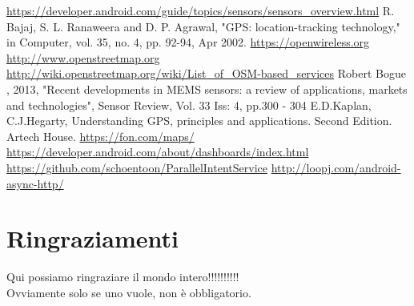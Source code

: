 \documentclass[12pt,a4paper,openright,twoside]{report}
\begin{document}
\begin{thebibliography}{90}
 \url{https://developer.android.com/guide/topics/sensors/sensors_overview.html}
 R. Bajaj, S. L. Ranaweera and D. P. Agrawal, "GPS: location-tracking technology," in Computer, vol. 35, no. 4, pp. 92-94, Apr 2002.
 \url{https://openwireless.org}
 \url{http://www.openstreetmap.org}
 \url{http://wiki.openstreetmap.org/wiki/List_of_OSM-based_services}
 Robert Bogue , 2013, "Recent developments in MEMS sensors: a review of applications, markets and technologies", Sensor Review, Vol. 33 Iss: 4, pp.300 - 304
 E.D.Kaplan, C.J.Hegarty, Understanding GPS, principles and applications. Second Edition. Artech House.
 \url{https://fon.com/maps/}
 \url{https://developer.android.com/about/dashboards/index.html}
 \url{https://github.com/schoentoon/ParallelIntentService}
 \url{http://loopj.com/android-async-http/}

\end{thebibliography}
\clearpage{\pagestyle{empty}\cleardoublepage}
\chapter*{Ringraziamenti}
\thispagestyle{empty}
Qui possiamo ringraziare il mondo intero!!!!!!!!!!\\
Ovviamente solo se uno vuole, non \`e obbligatorio.
\end{document}
